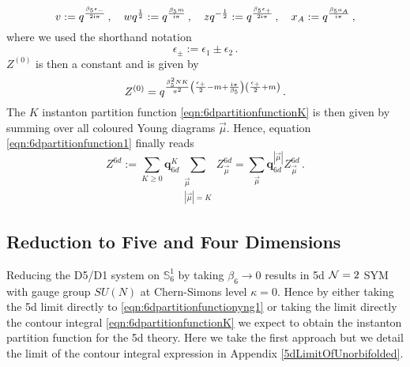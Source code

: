 \documentclass[main.tex]{subfiles}
\begin{document}
\begin{equation}\label{eqn:5dvariables}
v:=q^{\frac{\beta_5\epsilon_-}{2\mathrm{i}\pi}}\,,\quad wq^{\frac{1}{2}}:=q^{\frac{\beta_5m}{\mathrm{i}\pi}}\,,\quad zq^{-\frac{1}{2}}:=q^{\frac{\beta_5\epsilon_+}{2\mathrm{i}\pi}}\,,\quad x_A:=q^{\frac{\beta_5a_A}{\mathrm{i}\pi}}\,,
\end{equation}
where we used the shorthand notation
\begin{equation}
\epsilon_{\pm}:=\epsilon_1\pm\epsilon_2\,.
\end{equation}
$Z^{(0)}$ is then a constant and is given by
\begin{equation}
Z^{(0)}=q^{\frac{\beta_5^2NK}{\pi^2}\left(\frac{\epsilon_+}{2}-m+\frac{\mathrm{i}\pi}{\beta_5}\right)\left(\frac{\epsilon_+}{2}+m\right)}\,.
\end{equation}
The $K$ instanton partition function \eqref{eqn:6dpartitionfunctionK} is then given by summing over all coloured Young diagrams $\vec{\mu}$.
Hence, equation \eqref{eqn:6dpartitionfunction1} finally reads
\begin{equation}\label{eqn:6dpartitionfunctionyng1}
Z^{6d}:=\sum_{K\geq0}\mathbf{q}_{6d}^K\sum_{\substack{\vec{\mu}\\|\vec{\mu}|=K}}Z_{\vec{\mu}}^{6d}=\sum_{\vec{\mu}}\mathbf{q}^{|\vec{\mu}|}_{6d}Z_{\vec{\mu}}^{6d}\,.
\end{equation}

\subsection{Reduction to Five and Four Dimensions}
Reducing the D5/D1 system on $\mathbb{S}^1_6$ by taking $\beta_6\to0$ results in 5d $\mathcal{N}=2$ SYM with gauge group $SU(N)$ at Chern-Simons level $\kappa=0$. Hence by either taking the 5d limit directly to \eqref{eqn:6dpartitionfunctionyng1} or taking the limit directly the contour integral \eqref{eqn:6dpartitionfunctionK} we expect to obtain the instanton partition function for the 5d theory. Here we take the first approach but we detail the limit of the contour integral expression in Appendix \ref{5dLimitOfUnorbifolded}.
\end{document}

